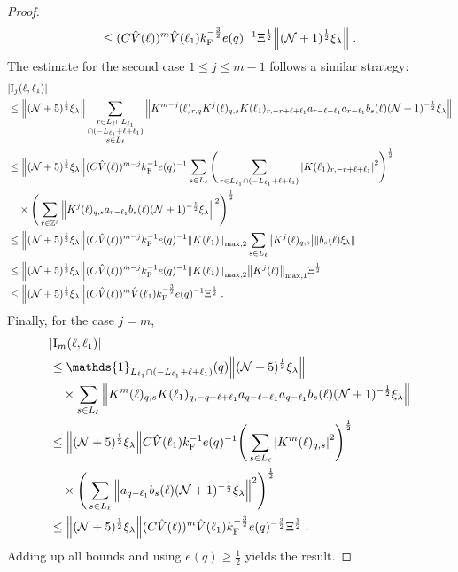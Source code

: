 \documentclass[12pt,a4paper]{article}
\numberwithin{equation}{section}
\newcommand{\1}{\mathbb{I}}
\newcommand{\F}{\mathrm{F}}
\newcommand{\I}{\mathrm{I}}
\newcommand{\Z}{\mathbb{Z}}
\newcommand{\NN}{\mathcal{N}}
\newcommand{\half}{\frac{1}{2}}
\theoremstyle{plain}
\theoremstyle{definition}
\theoremstyle{remark}
\theoremstyle{plain}
\theoremstyle{definition}
\theoremstyle{remark}
\begin{document}
\begin{proof}
\begin{equation}
	\leq (C \hat{V}(\ell))^m
		\hat{V}(\ell_1)
		k_{\F}^{-\frac 32} e(q)^{-1} \Xi^\half
		\norm{(\NN+1)^\half \xi_\lambda} \;. \label{eq:estEQ1121}
\end{equation} 
The estimate for the second case $ 1 \le j \le m-1 $ follows a similar strategy:
\begin{align}
	&|\I_j(\ell, \ell_1)| \nonumber\\
	&\leq \norm{ (\NN+5)^{\half} \xi_\lambda}
		\sum_{\substack{r\in L_{\ell} \cap L_{\ell_1} \\ \cap (-L_{\ell_1} + \ell + \ell_1)\\s\in L_{\ell}}}
		\norm{K^{m-j}(\ell)_{r,q} K^j(\ell)_{q,s} K(\ell_1)_{r,-r+\ell+\ell_1} a_{r-\ell-\ell_1} a_{r-\ell_1} b_{s}(\ell) (\NN+1)^{-\half} \xi_\lambda }\nonumber\\
	&\leq \norm{ (\NN+5)^{\half} \xi_\lambda} 
		(C \hat{V}(\ell))^{m-j} k_{\F}^{-1} e(q)^{-1}
		\sum_{s\in L_{\ell}}
		\Bigg(\sum_{r\in L_{\ell_1} \cap (-L_{\ell_1} + \ell + \ell_1)}\abs{ K(\ell_1)_{r,-r+\ell+\ell_1} }^2\Bigg)^\half \nonumber\\
	&\quad \times\Bigg( \sum_{r \in \Z^3}\norm{K^{j}(\ell)_{q,s} a_{r-\ell_1} b_{s}(\ell) (\NN+1)^{-\half} \xi_\lambda }^2 \Bigg)^\half \nonumber\\
	&\leq \norm{ (\NN+5)^{\half} \xi_\lambda}
		(C \hat{V}(\ell))^{m-j} k_{\F}^{-1} e(q)^{-1}
		\norm{K(\ell_1)}_{\max,2}
		\sum_{s\in L_{\ell}}\abs{K^{j}(\ell)_{q,s}}
		\norm{b_{s}(\ell) \xi_\lambda }		
	\nonumber\\
	&\leq \norm{(\NN+5)^\half \xi_\lambda }
		(C \hat{V}(\ell))^{m-j} k_{\F}^{-1} e(q)^{-1}
		\norm{ K(\ell_1) }_{\max,2}
		\norm{ K^{j}(\ell)}_{\mathrm{max,1}} \Xi^\half \nonumber \\
	&\leq \norm{(\NN+5)^\half \xi_\lambda }
		(C \hat{V}(\ell))^m
		\hat{V}(\ell_1)
		k_{\F}^{-\frac 32} e(q)^{-1} \Xi^\half \;.
\end{align}
Finally, for the case $ j = m $,
\begin{align}
	&|\I_m(\ell, \ell_1)| \nonumber\\
	&\leq \mathds{1}_{L_{\ell_1} \cap (-L_{\ell_1} + \ell + \ell_1)}(q) \norm{(\NN+5)^{\half} \xi_\lambda} \\
	& \quad \times
		\sum_{s \in L_{\ell}}
		\norm{ K^m(\ell)_{q,s} K(\ell_1)_{q,-q+\ell+\ell_1} a_{q-\ell-\ell_1} a_{q-\ell_1} b_{s}(\ell) (\NN+1)^{-\half} \xi_\lambda } \nonumber\\
	&\leq \norm{(\NN+5)^{\half} \xi_\lambda}
		C \hat{V}(\ell_1) k_{\F}^{-1} e(q)^{-1}
		\Bigg( \sum_{s \in L_{\ell}} \abs{K^m(\ell)_{q,s}}^2\Bigg)^\half \\
		& \quad \times\Bigg(\sum_{s \in L_{\ell}}  \norm{ a_{q-\ell_1} b_s(\ell) (\NN+1)^{-\half} \xi_\lambda }^2\Bigg)^\half \nonumber\\
	&\leq \norm{(\NN+5)^\half \xi_\lambda }
		(C \hat{V}(\ell))^m
		\hat{V}(\ell_1)
		k_{\F}^{-\frac 32} e(q)^{-\frac 32} \Xi^\half \;. \label{eq:estEQ1123}
\end{align}
Adding up all bounds and using $ e(q) \ge \half $ yields the result.
\end{proof}
\end{document}
